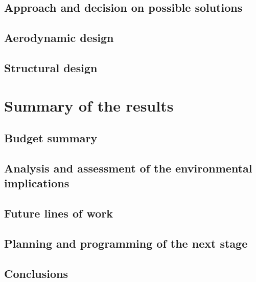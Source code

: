 \documentclass[11pt, a4paper, twoside]{book}
\begin{document}
\section{Approach and decision on possible solutions}


\newpage
\section{Aerodynamic design}


\section{Structural design}


\chapter{Summary of the results}

\section{Budget summary}

\section{Analysis and assessment of the environmental implications}

\section{Future lines of work}

\section{Planning and programming of the next stage}

\section{Conclusions}





\raggedleft

\end{document}
